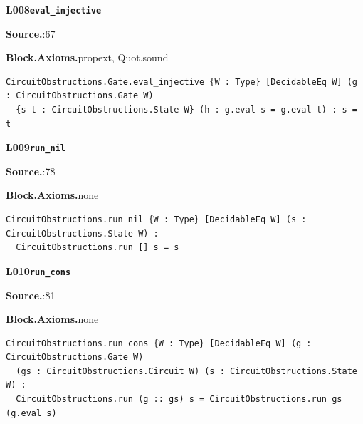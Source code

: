\par\medskip\noindent\begin{minipage}{\textwidth}
{\small\bfseries L008\enspace\texttt{eval\_injective}\par}
{\footnotesize\raggedright\textbf{Source.}\enspace{}:67\par
\textbf{Block.}\quad\textbf{Axioms.}\enspace propext, Quot.sound\par}\nopagebreak
\begin{lstlisting}
CircuitObstructions.Gate.eval_injective {W : Type} [DecidableEq W] (g : CircuitObstructions.Gate W)
  {s t : CircuitObstructions.State W} (h : g.eval s = g.eval t) : s = t
\end{lstlisting}
\end{minipage}\par

\par\medskip\noindent\begin{minipage}{\textwidth}
{\small\bfseries L009\enspace\texttt{run\_nil}\par}
{\footnotesize\raggedright\textbf{Source.}\enspace{}:78\par
\textbf{Block.}\quad\textbf{Axioms.}\enspace none\par}\nopagebreak
\begin{lstlisting}
CircuitObstructions.run_nil {W : Type} [DecidableEq W] (s : CircuitObstructions.State W) :
  CircuitObstructions.run [] s = s
\end{lstlisting}
\end{minipage}\par

\par\medskip\noindent\begin{minipage}{\textwidth}
{\small\bfseries L010\enspace\texttt{run\_cons}\par}
{\footnotesize\raggedright\textbf{Source.}\enspace{}:81\par
\textbf{Block.}\quad\textbf{Axioms.}\enspace none\par}\nopagebreak
\begin{lstlisting}
CircuitObstructions.run_cons {W : Type} [DecidableEq W] (g : CircuitObstructions.Gate W)
  (gs : CircuitObstructions.Circuit W) (s : CircuitObstructions.State W) :
  CircuitObstructions.run (g :: gs) s = CircuitObstructions.run gs (g.eval s)
\end{lstlisting}
\end{minipage}\par


